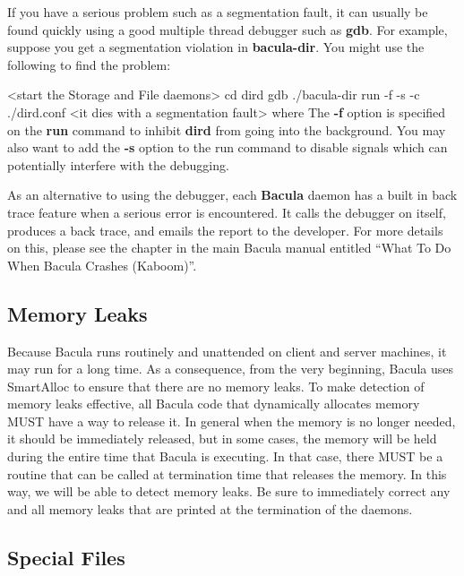 If you have a serious problem such as a segmentation fault, it can usually be
found quickly using a good multiple thread debugger such as {\bf gdb}. For
example, suppose you get a segmentation violation in {\bf bacula-dir}. You
might use the following to find the problem:

{\textless}start the Storage and File daemons{\textgreater}
cd dird
gdb ./bacula-dir
run -f -s -c ./dird.conf
{\textless}it dies with a segmentation fault{\textgreater}
where
The {\bf -f} option is specified on the {\bf run} command to inhibit {\bf
dird} from going into the background. You may also want to add the {\bf -s}
option to the run command to disable signals which can potentially interfere
with the debugging.

As an alternative to using the debugger, each {\bf Bacula} daemon has a built
in back trace feature when a serious error is encountered. It calls the
debugger on itself, produces a back trace, and emails the report to the
developer. For more details on this, please see the chapter in the main Bacula
manual entitled ``What To Do When Bacula Crashes (Kaboom)''.

\subsection{Memory Leaks}

Because Bacula runs routinely and unattended on client and server machines, it
may run for a long time. As a consequence, from the very beginning, Bacula
uses SmartAlloc to ensure that there are no memory leaks. To make detection of
memory leaks effective, all Bacula code that dynamically allocates memory MUST
have a way to release it. In general when the memory is no longer needed, it
should be immediately released, but in some cases, the memory will be held
during the entire time that Bacula is executing. In that case, there MUST be a
routine that can be called at termination time that releases the memory. In
this way, we will be able to detect memory leaks. Be sure to immediately
correct any and all memory leaks that are printed at the termination of the
daemons.

\subsection{Special Files}

